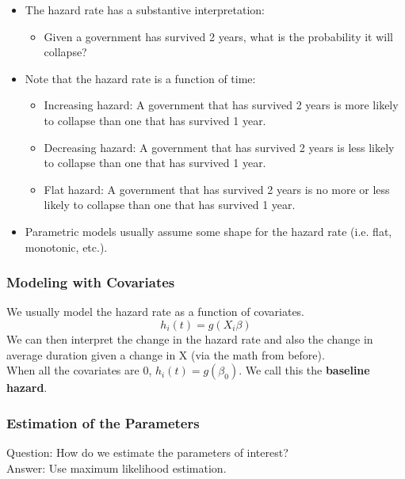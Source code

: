 \documentclass{beamer}
\begin{document}
\begin{frame}
\begin{itemize}
\item The hazard rate has a substantive interpretation:
\pause
\begin{itemize}
\item Given a government has survived 2 years, what is the probability it will collapse?
\end{itemize}
\pause
\item Note that the hazard rate is a function of time:
\pause
\begin{itemize}
\item Increasing hazard: A government that has survived 2 years is
more likely to collapse than one that has survived 1 year.
\pause
\item Decreasing hazard: A government that has survived 2 years is
less likely to collapse than one that has survived 1 year.
\pause
\item Flat hazard: A government that has survived 2 years is no more
or less likely to collapse than one that has survived 1 year.
\end{itemize}
\pause
\item Parametric models usually assume some shape for the hazard
rate (i.e. flat, monotonic, etc.). 
\end{itemize}
\end{frame}

\begin{frame}
\frametitle{Modeling with Covariates}
\pause
We usually model the hazard rate as a function of covariates.
\pause
\begin{equation*}
h_i(t) = g(X_i \beta)
\end{equation*}
\pause
We can then interpret the change in the hazard rate and also the
change in average duration given a change in X (via the math from before).\\
\pause
\bigskip
When all the covariates are 0, $h_i(t) = g(\beta_0)$.  We call this the
\textbf{baseline hazard}. 
\end{frame}

\begin{frame}
\frametitle{Estimation of the Parameters}
Question: How do we estimate the parameters of interest?\\
\pause
\bigskip 
Answer: Use maximum likelihood estimation.
\end{frame}
\end{document}
